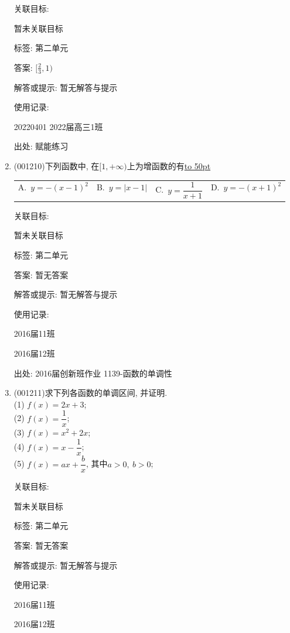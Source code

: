 \documentclass[10pt,a4paper]{article}
\newcommand{\blank}[1]{\underline{\hbox to #1pt{}}}
\newcommand{\fourch}[4]{\par\begin{tabular}{p{.23\textwidth}p{.23\textwidth}p{.23\textwidth}p{.23\textwidth}}
A.~#1 &B.~#2& C.~#3& D.~#4
\end{tabular}}
\begin{document}
\begin{enumerate}[1.]
关联目标:

暂未关联目标



标签: 第二单元

答案: $[\frac 23,1)$

解答或提示: 暂无解答与提示

使用记录:

20220401	2022届高三1班	


出处: 赋能练习
\item { (001210)}下列函数中, 在$[1,+\infty)$上为增函数的有\blank{50}
\fourch{$y=-(x-1)^2$}{$y=|x-1|$}{$y=\dfrac{1}{x+1}$}{$y=-(x+1)^2$}


关联目标:

暂未关联目标



标签: 第二单元

答案: 暂无答案

解答或提示: 暂无解答与提示

使用记录:

2016届11班	

2016届12班	


出处: 2016届创新班作业	1139-函数的单调性
\item { (001211)}求下列各函数的单调区间, 并证明.\\ 
(1) $f(x)=2x+3$;\\ 
(2) $f(x)=\dfrac{1}{x}$;\\ 
(3) $f(x)=x^2+2x$;\\ 
(4) $f(x)=x-\dfrac{1}{x}$;\\ 
(5) $f(x)=ax+\dfrac{b}{x}$, 其中$a>0, \ b>0$;


关联目标:

暂未关联目标



标签: 第二单元

答案: 暂无答案

解答或提示: 暂无解答与提示

使用记录:

2016届11班					

2016届12班					



\end{enumerate}
\end{document}
